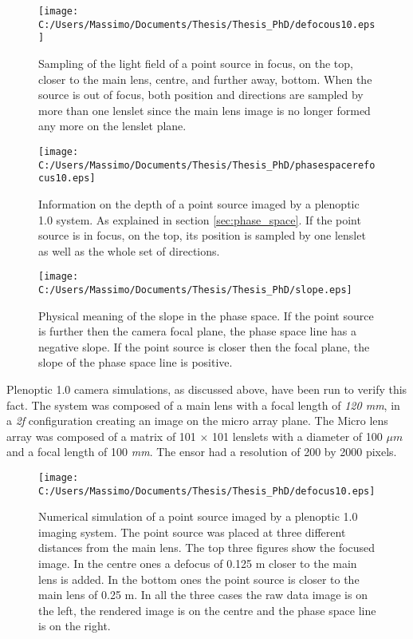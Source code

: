 \begin{figure}[H]
 	\centering
 	\texttt{[image: C:/Users/Massimo/Documents/Thesis/Thesis\_PhD/defocous10.eps]}
 	\caption{\label{fig:depth} Sampling of the light field of a point source in focus, on the top, closer to the main lens, centre, and further away, bottom. When the source is out of focus, both position and directions are sampled by more than one lenslet since the main lens image is no longer formed any more on the lenslet plane. }
 \end{figure}
 \begin{figure}[H]
 	\centering
 	\texttt{[image: C:/Users/Massimo/Documents/Thesis/Thesis\_PhD/phasespacerefocus10.eps]}
 	\caption{\label{fig:depth1} Information on the depth of a point source imaged by a plenoptic 1.0 system. As explained in section \ref{sec:phase_space}. If the point source is in focus, on the top, its position is sampled by one lenslet as well as the whole set of directions.}
 \end{figure}
 \begin{figure}[H]
 	\centering
 	\texttt{[image: C:/Users/Massimo/Documents/Thesis/Thesis\_PhD/slope.eps]}
 	\caption{\label{fig:depth3} Physical meaning of the slope in the phase space. If the point source is further then the camera focal plane, the phase space line has a negative slope. If the point source is closer then the focal plane, the slope of the phase space line is positive.}
 \end{figure}
 Plenoptic 1.0 camera simulations, as discussed above, have been run to verify this fact. The system was composed of a main lens with a focal length of \textit{120 mm}, in a \textit{2f} configuration creating an image on the micro array plane. The Micro lens array was composed of a matrix of 101 $\times$ 101 lenslets with a diameter of 100 $\mu m$ and a focal length of 100 \textit{mm}. The ensor had a resolution of 200 by 2000 pixels.
 \begin{figure}[H]
 	\centering
 	\texttt{[image: C:/Users/Massimo/Documents/Thesis/Thesis\_PhD/defocus10.eps]}
 	\caption{\label{fig:depth4} Numerical simulation of a point source imaged by a plenoptic 1.0 imaging system. The point source was placed at three different distances from the main lens. The top three figures show the focused image. In the centre ones a defocus of 0.125 m closer to the main lens is added. In the bottom ones the point source is closer to the main lens of 0.25 m. In all the three cases the raw data image is on the left, the rendered image is on the centre and the phase space line is on the right.}
 \end{figure}
 \newpage
